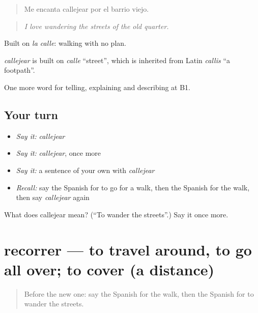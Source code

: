 \begin{quote}
Me encanta callejear por el barrio viejo.
\end{quote}

\begin{quote}
\emph{I love wandering the streets of the old quarter.}
\end{quote}

Built on \emph{la calle}: walking with no plan.

\begin{cousinweb}
\emph{callejear} is built on \emph{calle} \textquotedblleft{}street\textquotedblright{}, which is inherited from Latin \emph{callis} \textquotedblleft{}a footpath\textquotedblright{}.
\end{cousinweb}

\begin{grammarlens}[title={What you've built}]
One more word for telling, explaining and describing at B1.
\end{grammarlens}

\subsection*{Your turn}
\begin{itemize}
\raggedright
  \item \emph{Say it:} \emph{callejear}
  \item \emph{Say it:} \emph{callejear}, once more
  \item \emph{Say it:} a sentence of your own with \emph{callejear}
  \item \emph{Recall:} say the Spanish for to go for a walk, then the Spanish for the walk, then say \emph{callejear} again
\end{itemize}

\begin{tcolorbox}[breakable,colback=teal!4,colframe=teal!35!black,title={Before you move on}]
What does callejear mean? (\textquotedblleft{}To wander the streets\textquotedblright{}.) Say it once more.
\end{tcolorbox}
\section[recorrer]{recorrer — to travel around, to go all over; to cover (a distance)}

\label{lesson:ES-C674-recorrer}



\begin{quote}
Before the new one: say the Spanish for the walk, then the Spanish for to wander the streets.
\end{quote}

